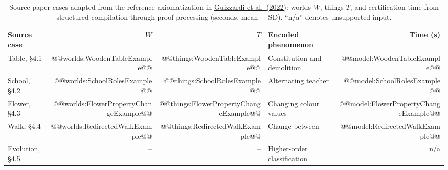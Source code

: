 \providecommand{\ufosourcecitation}{\href{https://doi.org/10.3233/AO-210256}{Guizzardi et al.\ (2022)}}
\begin{table}[htbp]
  \caption{Source-paper cases adapted from the reference axiomatization in \ufosourcecitation: worlds $W$, things $T$, and certification time
    from structured compilation through proof processing (seconds, mean $\pm$ SD).
    ``n/a'' denotes unsupported input.}
  \label{tab:examples}
  \begin{tabularx}{\textwidth}{@{}lrrYr@{}}
    \toprule Source case & $W$ & $T$ & Encoded phenomenon                 & Time (s)          \\\midrule
    Table, \S4.1         & @@worlds:WoodenTableExample@@ & @@things:WoodenTableExample@@ & Constitution and demolition        & @@model:WoodenTableExample@@ \\
    School, \S4.2        & @@worlds:SchoolRolesExample@@ & @@things:SchoolRolesExample@@ & Alternating teacher  & @@model:SchoolRolesExample@@ \\
    Flower, \S4.3        & @@worlds:FlowerPropertyChangeExample@@ & @@things:FlowerPropertyChangeExample@@ & Changing colour values             & @@model:FlowerPropertyChangeExample@@ \\
    Walk, \S4.4          & @@worlds:RedirectedWalkExample@@ & @@things:RedirectedWalkExample@@ & Change between      & @@model:RedirectedWalkExample@@ \\
    Evolution, \S4.5     & --  & --  & Higher-order classification        & n/a               \\
    \bottomrule
  \end{tabularx}
\end{table}
